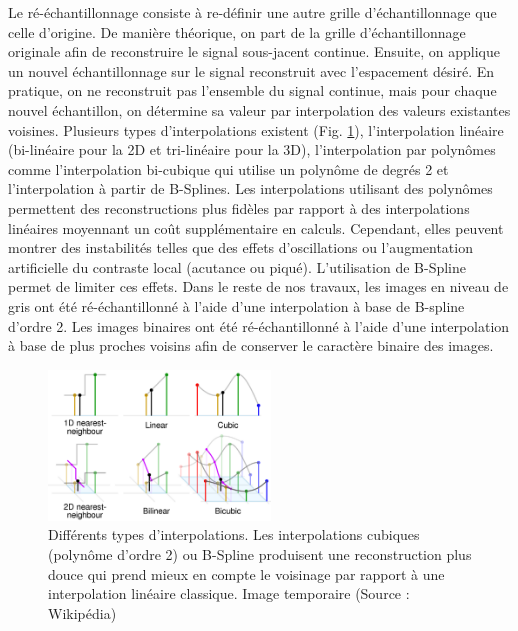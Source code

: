 Le ré-échantillonnage consiste à re-définir une autre grille d'échantillonnage que celle d'origine. De manière théorique, on part de la grille d'échantillonnage originale afin de reconstruire le signal sous-jacent continue. Ensuite, on applique un nouvel échantillonnage sur le signal reconstruit avec l'espacement désiré. En pratique, on ne reconstruit pas l'ensemble du signal continue, mais pour chaque nouvel échantillon, on détermine sa valeur par interpolation des valeurs existantes voisines. Plusieurs types d'interpolations existent (Fig. \ref{fig:interpolation}), l'interpolation linéaire (bi-linéaire pour la 2D et tri-linéaire pour la 3D), l'interpolation par polynômes comme l'interpolation bi-cubique qui utilise un polynôme de degrés 2 et l'interpolation à partir de B-Splines. Les interpolations utilisant des polynômes permettent des reconstructions plus fidèles par rapport à des interpolations linéaires moyennant un coût supplémentaire en calculs. Cependant, elles peuvent montrer des instabilités telles que des effets d'oscillations ou l'augmentation artificielle du contraste local (acutance ou piqué). L'utilisation de B-Spline permet de limiter ces effets. Dans le reste de nos travaux, les images en niveau de gris ont été ré-échantillonné à l'aide d'une interpolation à base de B-spline d'ordre 2. Les images binaires ont été ré-échantillonné à l'aide d'une interpolation à base de plus proches voisins afin de conserver le caractère binaire des images.


\begin{figure}[h]
  \centering
  \includegraphics[height=4cm]{Images/Interpolation.png}
  \caption{Différents types d'interpolations. Les interpolations cubiques (polynôme d'ordre 2) ou B-Spline produisent une reconstruction plus douce qui prend mieux en compte le voisinage par rapport à une interpolation linéaire classique. Image temporaire (Source : Wikipédia)}
  \label{fig:interpolation}
\end{figure}

